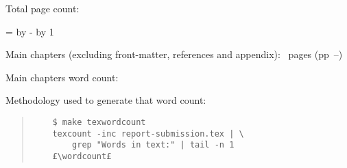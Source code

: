 \ifsubmission

\begin{defaultsffamily} %
Total page count: \pageref{LastPage}

\makeatletter
\@tempcnta=\relax%
\advance\@tempcnta by -%
\advance\@tempcnta by 1%
\xdef\contentpages{\the\@tempcnta}%
\makeatother

Main chapters (excluding front-matter, references and appendix):
\contentpages~pages
(pp~\pageref{firstcontentpage}--\pageref{lastcontentpage})

Main chapters word count: \wordcount

\vspace*{1em}
Methodology used to generate that word count:

\begin{quote}
\begin{verbatim}
    $ make texwordcount
    texcount -inc report-submission.tex | \
        grep "Words in text:" | tail -n 1
    £\wordcount£
\end{verbatim}
\end{quote}

\end{defaultsffamily}
\vspace{\fill}
\onehalfspacing






\else

